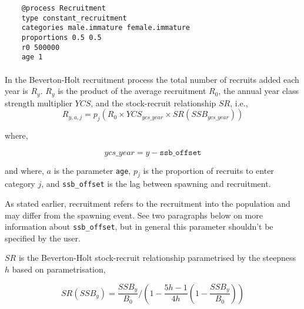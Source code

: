 {\small{\begin{verbatim}
	@process Recruitment
	type constant_recruitment
	categories male.immature female.immature
	proportions 0.5 0.5
	r0 500000
	age 1
\end{verbatim}}}

\paragraph{}\label{subsubsec:BH-recruitment}

In the Beverton-Holt recruitment process the total number of recruits added each year is $R_y$. $R_y$ is the product of the average recruitment $R_0$, the annual year class strength multiplier $YCS$, and the stock-recruit relationship $SR$, i.e.,
\begin{equation}\label{eq:BH}
  R_{y,a,j} = p_j(R_0 \times YCS_{ycs\_year} \times SR(SSB_{ycs\_year}))
\end{equation}

where,

\begin{equation}\label{eq:year_class}
ycs\_year = y - \texttt{ssb\_offset}
\end{equation}

and where, $a$ is the parameter \texttt{age}, $p_j$ is the proportion of recruits to enter category $j$, and \texttt{ssb\_offset} is the lag between spawning and recruitment. 

As stated earlier, recruitment refers to the recruitment into the population and may differ from the spawning event. See two paragraphs below on more information about \texttt{ssb\_offset}, but in general this parameter shouldn't be specified by the user.

$SR$ is the Beverton-Holt stock-recruit relationship parametrised by the steepness $h$ based on \cite{mace_doonan_88} parametrisation,

\begin{equation}\label{eq:BH_SR}
SR(SSB_y) = \frac{SSB_y}{B_0} / \left( 1-\frac{5h-1}{4h} \left( 1-\frac{SSB_y}{B_0} \right) \right)
\end{equation}

